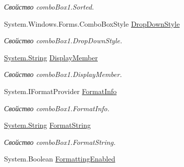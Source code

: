 \begin{DoxyCompactItemize}
\begin{DoxyCompactList}\small\item\em Свойство combo\+Box1.\+Sorted. \end{DoxyCompactList}\item 
System.\+Windows.\+Forms.\+Combo\+Box\+Style \mbox{\hyperlink{class_f_b_a_1_1_sys_d_b_edit_a7e799513c23c2c8a6b5aade7f0722481}{Drop\+Down\+Style}}
\begin{DoxyCompactList}\small\item\em Свойство combo\+Box1.\+Drop\+Down\+Style. \end{DoxyCompactList}\item 
\mbox{\hyperlink{namespace_f_b_a_a940b390561ecfbdb6e1606ec1711bd59a27118326006d3829667a400ad23d5d98}{System.\+String}} \mbox{\hyperlink{class_f_b_a_1_1_sys_d_b_edit_ada000c9a7c98c6ecbba7b3e956dd8bfb}{Display\+Member}}
\begin{DoxyCompactList}\small\item\em Свойство combo\+Box1.\+Display\+Member. \end{DoxyCompactList}\item 
System.\+I\+Format\+Provider \mbox{\hyperlink{class_f_b_a_1_1_sys_d_b_edit_a6e439fc986c54ed3dc25e5fb95e3759d}{Format\+Info}}
\begin{DoxyCompactList}\small\item\em Свойство combo\+Box1.\+Format\+Info. \end{DoxyCompactList}\item 
\mbox{\hyperlink{namespace_f_b_a_a940b390561ecfbdb6e1606ec1711bd59a27118326006d3829667a400ad23d5d98}{System.\+String}} \mbox{\hyperlink{class_f_b_a_1_1_sys_d_b_edit_ad790c8289c315407ac6e23254bcef9fd}{Format\+String}}
\begin{DoxyCompactList}\small\item\em Свойство combo\+Box1.\+Format\+String. \end{DoxyCompactList}\item 
System.\+Boolean \mbox{\hyperlink{class_f_b_a_1_1_sys_d_b_edit_af9125dca573b441344e210447d8de783}{Formatting\+Enabled}}

\end{DoxyCompactItemize}

